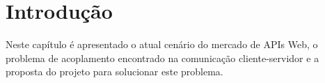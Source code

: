 \chapter{Introdução}

Neste capítulo é apresentado o atual cenário do mercado de APIs Web, o problema de acoplamento encontrado na comunicação cliente-servidor e a proposta do projeto para solucionar este problema.






